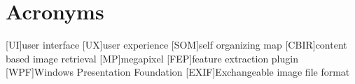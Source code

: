 %
%
%
%
%
%


\chapter*{Acronyms}


\begin{acronym}[TDMA]

[UI]{user interface}
[UX]{user experience}
[SOM]{self organizing map}
[CBIR]{content based image retrieval}
[MP]{megapixel}
[FEP]{feature extraction plugin}
[WPF]{Windows Presentation Foundation}
[EXIF]{Exchangeable image file format}

\end{acronym}
\vfill

\cleardoublepage